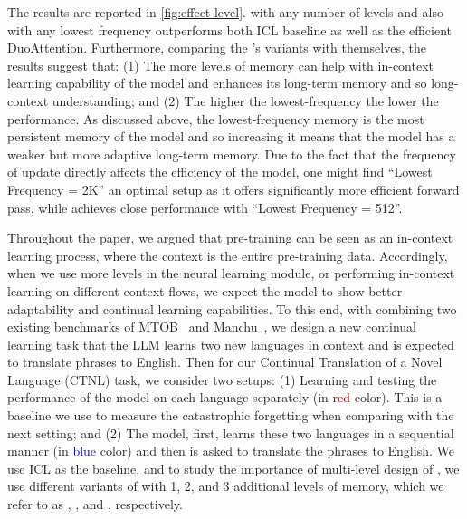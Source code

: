 


The results are reported in \autoref{fig:effect-level}. \model{} with any number of levels and also with any lowest frequency outperforms both ICL baseline as well as the efficient DuoAttention. Furthermore, comparing the \model's variants with themselves, the results suggest that: (1) The more levels of memory can help with in-context learning capability of the model and enhances its long-term memory and so long-context understanding;  and (2) The higher the lowest-frequency the lower the performance. As discussed above, the lowest-frequency memory is the most persistent memory of the model and so increasing it means that the model has a weaker but more adaptive long-term memory. Due to the fact that the frequency of update directly affects the efficiency of the model, one might find ``Lowest Frequency = 2K'' an optimal setup as it offers significantly more efficient forward pass, while achieves close performance with ``Lowest Frequency = 512''. 






Throughout the paper, we argued that pre-training can be seen as an in-context learning process, where the context is the entire pre-training data. Accordingly, when we use more levels in the neural learning module, or performing in-context learning on different context flows, we expect the model to show better adaptability and continual learning capabilities. To this end, with combining two existing benchmarks of MTOB~\citep{tanzer2024a} and Manchu~\citep{pei2025understanding}, we design a new continual learning task that the LLM learns two new languages in context and is expected to translate phrases to English. 
Then for our Continual Translation of a Novel Language (CTNL) task, we consider two setups: (1) Learning and testing the performance of the model on each language separately (in \textcolor{darkred}{red} color). This is a baseline we use to measure the catastrophic forgetting when comparing with the next setting; and (2) The model, first, learns these two languages in a sequential manner (in \textcolor{darkblue}{blue} color) and then is asked to translate the phrases to English. We use ICL as the baseline, and to study the importance of multi-level design of \model, we use different variants of \model{} with 1, 2, and 3 additional levels of memory, which we refer to as , , and , respectively.


